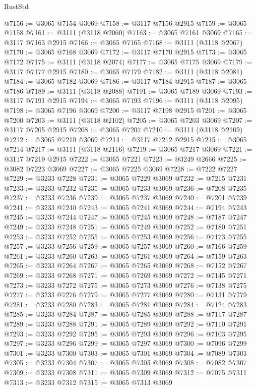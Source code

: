 \begin{lexlean}{RustStd}
\begin{coremodule}
@7156 := @3065 @7154 @3069
@7158 := @3117 @7156 @2915
@7159 := @3065 @7158
@7161 := @3111 (@3118 @2060)
@7163 := @3065 @7161 @3069
@7165 := @3117 @7163 @2915
@7166 := @3065 @7165
@7168 := @3111 (@3118 @2067)
@7170 := @3065 @7168 @3069
@7172 := @3117 @7170 @2915
@7173 := @3065 @7172
@7175 := @3111 (@3118 @2074)
@7177 := @3065 @7175 @3069
@7179 := @3117 @7177 @2915
@7180 := @3065 @7179
@7182 := @3111 (@3118 @2081)
@7184 := @3065 @7182 @3069
@7186 := @3117 @7184 @2915
@7187 := @3065 @7186
@7189 := @3111 (@3118 @2088)
@7191 := @3065 @7189 @3069
@7193 := @3117 @7191 @2915
@7194 := @3065 @7193
@7196 := @3111 (@3118 @2095)
@7198 := @3065 @7196 @3069
@7200 := @3117 @7198 @2915
@7201 := @3065 @7200
@7203 := @3111 (@3118 @2102)
@7205 := @3065 @7203 @3069
@7207 := @3117 @7205 @2915
@7208 := @3065 @7207
@7210 := @3111 (@3118 @2109)
@7212 := @3065 @7210 @3069
@7214 := @3117 @7212 @2915
@7215 := @3065 @7214
@7217 := @3111 (@3118 @2116)
@7219 := @3065 @7217 @3069
@7221 := @3117 @7219 @2915
@7222 := @3065 @7221
@7223 := @3249 @2666
@7225 := @3082 @7223 @3069
@7227 := @3065 @7225 @3069
@7228 := @7222 @7227
@7229 := @3233 @7228
@7231 := @3065 @7229 @3069
@7232 := @7215 @7231
@7233 := @3233 @7232
@7235 := @3065 @7233 @3069
@7236 := @7208 @7235
@7237 := @3233 @7236
@7239 := @3065 @7237 @3069
@7240 := @7201 @7239
@7241 := @3233 @7240
@7243 := @3065 @7241 @3069
@7244 := @7194 @7243
@7245 := @3233 @7244
@7247 := @3065 @7245 @3069
@7248 := @7187 @7247
@7249 := @3233 @7248
@7251 := @3065 @7249 @3069
@7252 := @7180 @7251
@7253 := @3233 @7252
@7255 := @3065 @7253 @3069
@7256 := @7173 @7255
@7257 := @3233 @7256
@7259 := @3065 @7257 @3069
@7260 := @7166 @7259
@7261 := @3233 @7260
@7263 := @3065 @7261 @3069
@7264 := @7159 @7263
@7265 := @3233 @7264
@7267 := @3065 @7265 @3069
@7268 := @7152 @7267
@7269 := @3233 @7268
@7271 := @3065 @7269 @3069
@7272 := @7145 @7271
@7273 := @3233 @7272
@7275 := @3065 @7273 @3069
@7276 := @7138 @7275
@7277 := @3233 @7276
@7279 := @3065 @7277 @3069
@7280 := @7131 @7279
@7281 := @3233 @7280
@7283 := @3065 @7281 @3069
@7284 := @7124 @7283
@7285 := @3233 @7284
@7287 := @3065 @7285 @3069
@7288 := @7117 @7287
@7289 := @3233 @7288
@7291 := @3065 @7289 @3069
@7292 := @7110 @7291
@7293 := @3233 @7292
@7295 := @3065 @7293 @3069
@7296 := @7103 @7295
@7297 := @3233 @7296
@7299 := @3065 @7297 @3069
@7300 := @7096 @7299
@7301 := @3233 @7300
@7303 := @3065 @7301 @3069
@7304 := @7089 @7303
@7305 := @3233 @7304
@7307 := @3065 @7305 @3069
@7308 := @7082 @7307
@7309 := @3233 @7308
@7311 := @3065 @7309 @3069
@7312 := @7075 @7311
@7313 := @3233 @7312
@7315 := @3065 @7313 @3069

\end{coremodule}
\end{lexlean}
